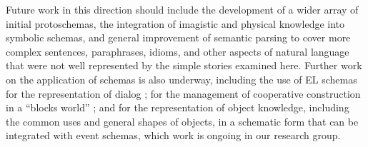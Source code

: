 Future work in this direction should include the development of a wider array of initial protoschemas, the integration of imagistic and physical knowledge into symbolic schemas, and general improvement of semantic parsing to cover more complex sentences, paraphrases, idioms, and other aspects of natural language that were not well represented by the simple stories examined here. Further work on the application of schemas is also underway, including the use of EL schemas for the representation of dialog \citep{lissa,kane2022flexible}; for the management of cooperative construction in a ``blocks world'' \citep{platonov2019spoken}; and for the representation of object knowledge, including the common uses and general shapes of objects, in a schematic form that can be integrated with event schemas, which work is ongoing in our research group.